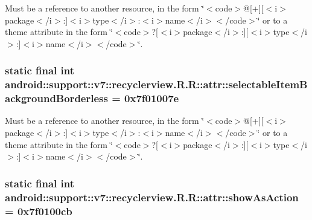 Must be a reference to another resource, in the form \char`\"{}$<$code$>$@\mbox{[}+\mbox{]}\mbox{[}$<$i$>$package$<$/i$>$:\mbox{]}$<$i$>$type$<$/i$>$:$<$i$>$name$<$/i$>$$<$/code$>$\char`\"{} or to a theme attribute in the form \char`\"{}$<$code$>$?\mbox{[}$<$i$>$package$<$/i$>$:\mbox{]}\mbox{[}$<$i$>$type$<$/i$>$:\mbox{]}$<$i$>$name$<$/i$>$$<$/code$>$\char`\"{}. \hypertarget{classandroid_1_1support_1_1v7_1_1recyclerview_1_1_r_1_1attr_0904660f8e7b78ebbf95fa230b3e0f2c}{
\subsubsection[{selectableItemBackgroundBorderless}]{\setlength{\rightskip}{0pt plus 5cm}static final int android::support::v7::recyclerview.R.R::attr::selectableItemBackgroundBorderless = 0x7f01007e}}
\label{classandroid_1_1support_1_1v7_1_1recyclerview_1_1_r_1_1attr_0904660f8e7b78ebbf95fa230b3e0f2c}


Must be a reference to another resource, in the form \char`\"{}$<$code$>$@\mbox{[}+\mbox{]}\mbox{[}$<$i$>$package$<$/i$>$:\mbox{]}$<$i$>$type$<$/i$>$:$<$i$>$name$<$/i$>$$<$/code$>$\char`\"{} or to a theme attribute in the form \char`\"{}$<$code$>$?\mbox{[}$<$i$>$package$<$/i$>$:\mbox{]}\mbox{[}$<$i$>$type$<$/i$>$:\mbox{]}$<$i$>$name$<$/i$>$$<$/code$>$\char`\"{}. \hypertarget{classandroid_1_1support_1_1v7_1_1recyclerview_1_1_r_1_1attr_c968408fd2b62031f0d570d80099277d}{
\subsubsection[{showAsAction}]{\setlength{\rightskip}{0pt plus 5cm}static final int android::support::v7::recyclerview.R.R::attr::showAsAction = 0x7f0100cb}}
\label{classandroid_1_1support_1_1v7_1_1recyclerview_1_1_r_1_1attr_c968408fd2b62031f0d570d80099277d}


